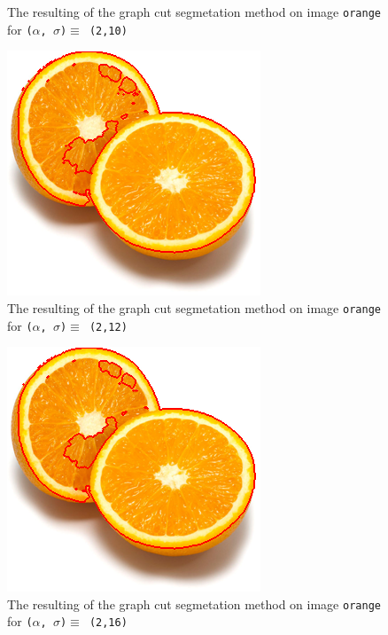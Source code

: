 {\begin{minipage}{0.45\linewidth}
\begin{figure}[H]
      \caption{The resulting of the graph cut segmetation method on image \texttt{orange} for
        \texttt{($\alpha$, $\sigma$)$ \equiv$ (2,10)}}
      \label{fig:04_orange2_a2_s10}
    \end{figure}
  \end{minipage}

  \begin{minipage}{0.45\linewidth}
    \begin{figure}[H]
      \includegraphics[scale=0.5]{./images/04/Q11/var_a_b/orange/graphcut2_a2_s12.png}
      \caption{The resulting of the graph cut segmetation method on image \texttt{orange} for
        \texttt{($\alpha$, $\sigma$)$ \equiv$ (2,12)}}
      \label{fig:04_orange2_a2_s12}
    \end{figure}
    \vfill
    \begin{figure}[H]
      \includegraphics[scale=0.5]{./images/04/Q11/var_a_b/orange/graphcut2_a2_s16.png}
      \caption{The resulting of the graph cut segmetation method on image \texttt{orange} for
        \texttt{($\alpha$, $\sigma$)$ \equiv$ (2,16)}}
      \label{fig:04_orange2_a2_s16}
    \end{figure}

\end{minipage}}
